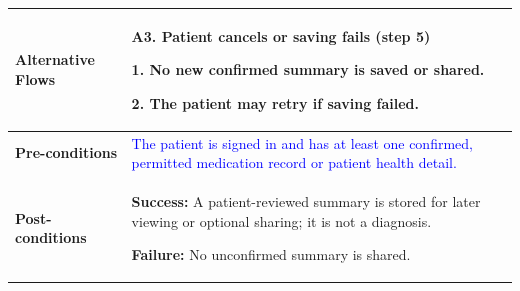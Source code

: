 \begin{longtable}{|p{}|p{}|}
\\ \hline
\textbf{Alternative Flows} &
\textbf{A3. Patient cancels or saving fails (step 5)}\par
1. No new confirmed summary is saved or shared.\par
2. The patient may retry if saving failed.
\\ \hline
\textbf{Pre-conditions} &
\textcolor{blue}{The patient is signed in and has at least one confirmed, permitted medication record or patient health detail.}
\\ \hline
\textbf{Post-conditions} &
\textbf{Success:} A patient-reviewed summary is stored for later viewing or optional sharing; it is not a diagnosis.\par
\textbf{Failure:} No unconfirmed summary is shared.
\\ \hline
\end{longtable}
\clearpage
